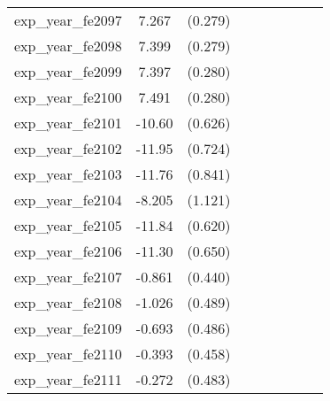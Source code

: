 {\begin{tabular}{l*{4}{cc}}
exp\_year\_fe2097&    7.267\sym{***}&  (0.279)&                  &         &                  &         &                  &         \\
exp\_year\_fe2098&    7.399\sym{***}&  (0.279)&                  &         &                  &         &                  &         \\
exp\_year\_fe2099&    7.397\sym{***}&  (0.280)&                  &         &                  &         &                  &         \\
exp\_year\_fe2100&    7.491\sym{***}&  (0.280)&                  &         &                  &         &                  &         \\
exp\_year\_fe2101&   -10.60\sym{***}&  (0.626)&                  &         &                  &         &                  &         \\
exp\_year\_fe2102&   -11.95\sym{***}&  (0.724)&                  &         &                  &         &                  &         \\
exp\_year\_fe2103&   -11.76\sym{***}&  (0.841)&                  &         &                  &         &                  &         \\
exp\_year\_fe2104&   -8.205\sym{***}&  (1.121)&                  &         &                  &         &                  &         \\
exp\_year\_fe2105&   -11.84\sym{***}&  (0.620)&                  &         &                  &         &                  &         \\
exp\_year\_fe2106&   -11.30\sym{***}&  (0.650)&                  &         &                  &         &                  &         \\
exp\_year\_fe2107&   -0.861         &  (0.440)&                  &         &                  &         &                  &         \\
exp\_year\_fe2108&   -1.026\sym{*}  &  (0.489)&                  &         &                  &         &                  &         \\
exp\_year\_fe2109&   -0.693         &  (0.486)&                  &         &                  &         &                  &         \\
exp\_year\_fe2110&   -0.393         &  (0.458)&                  &         &                  &         &                  &         \\
exp\_year\_fe2111&   -0.272         &  (0.483)&                  &         &                  &         &                  &         \\

\end{tabular}}
